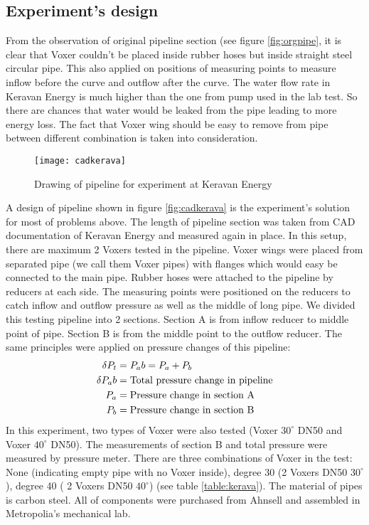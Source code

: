\subsection{Experiment's design}
From the observation of original pipeline section (see figure \vref{fig:orgpipe}, it is clear that Voxer couldn't be placed inside rubber hoses but inside straight steel circular pipe. This also applied on positions of measuring points to measure inflow before the curve and outflow after the curve. The water flow rate in Keravan Energy is much higher than the one from pump used in the lab test. So there are chances that water would be leaked from the pipe leading to more energy loss. The fact that Voxer wing should be easy to remove from pipe between different combination is taken into consideration.
\begin{figure}[h]
  \centering
  \texttt{[image: cadkerava]}
  \caption{ Drawing of pipeline for experiment at Keravan Energy}
  \label{fig:cadkerava}
\end{figure}
A design of pipeline shown in figure \vref{fig:cadkerava} is the experiment's solution for most of problems above. The length of pipeline section was taken from CAD documentation of Keravan Energy and measured again in place. In this setup, there are maximum 2 Voxers tested in the pipeline. Voxer wings were placed from separated pipe (we call them Voxer pipes) with flanges which would easy be connected to the main pipe. 
Rubber hoses were attached to the pipeline by reducers at each side. The measuring points were positioned on the reducers to catch inflow and outflow pressure as well as the middle of long pipe. We divided this testing pipeline into 2 sections. Section A is from inflow reducer to middle point of pipe. Section B is from the middle point to the outflow reducer. The same principles were applied on pressure changes of this pipeline: 
\begin{align}
\delta P_t&= P_ab = P_a + P_b \\
\delta P_ab&= \textnormal{Total pressure change in pipeline} \\
P_a&= \textnormal{Pressure change in section A} \\
P_b&= \textnormal{Pressure change in section B} \\
\end{align}
In this experiment, two types of Voxer were also tested (Voxer $30^{\circ}$ DN50 and Voxer $40^{\circ}$ DN50). The measurements of section B and total pressure were measured by pressure meter. There are three combinations of Voxer in the test: None (indicating empty pipe with no Voxer inside), degree 30 (2 Voxers DN50 $30^{\circ}$), degree 40 ( 2 Voxers DN50 $40^{\circ}$) (see table \ref{table:kerava}). The material of pipes is carbon steel. All of components were purchased from Ahnsell and assembled in Metropolia's mechanical lab.
